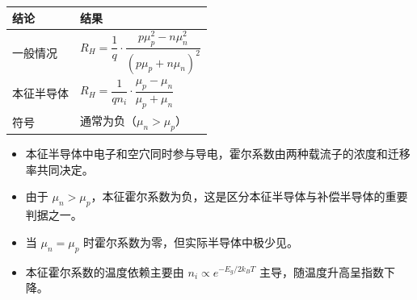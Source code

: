 \begin{formulabox}[答案汇总]
\begin{center}
\begin{tabular}{ll}
\toprule
\textbf{结论} & \textbf{结果} \\
\midrule
一般情况 & $R_H=\dfrac{1}{q}\cdot\dfrac{p\mu_p^2-n\mu_n^2}{(p\mu_p+n\mu_n)^2}$ \\
本征半导体 & $R_H=\dfrac{1}{qn_i}\cdot\dfrac{\mu_p-\mu_n}{\mu_p+\mu_n}$ \\
符号 & 通常为负（$\mu_n>\mu_p$） \\
\bottomrule
\end{tabular}
\end{center}
\end{formulabox}

\begin{insightbox}[物理图像]
\begin{itemize}
    \item 本征半导体中电子和空穴同时参与导电，霍尔系数由两种载流子的浓度和迁移率共同决定。
    \item 由于 $\mu_n>\mu_p$，本征霍尔系数为负，这是区分本征半导体与补偿半导体的重要判据之一。
    \item 当 $\mu_n=\mu_p$ 时霍尔系数为零，但实际半导体中极少见。
    \item 本征霍尔系数的温度依赖主要由 $n_i\propto e^{-E_g/2k_BT}$ 主导，随温度升高呈指数下降。
\end{itemize}
\end{insightbox}
